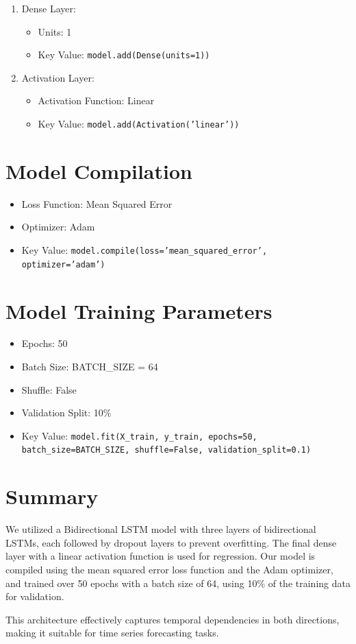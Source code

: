\begin{enumerate}
    \item {Dense Layer}:
    \begin{itemize}
        \item Units: 1
        \item Key Value: \texttt{model.add(Dense(units=1))}
    \end{itemize}

    \item {Activation Layer}:
    \begin{itemize}
        \item Activation Function: Linear
        \item Key Value: \texttt{model.add(Activation('linear'))}
    \end{itemize}
\end{enumerate}

\section*{Model Compilation}

\begin{itemize}
    \item Loss Function: Mean Squared Error
    \item Optimizer: Adam
    \item Key Value: \texttt{model.compile(loss='mean\_squared\_error', optimizer='adam')}
\end{itemize}

\section*{Model Training Parameters}

\begin{itemize}
    \item Epochs: 50
    \item Batch Size: BATCH\_SIZE = 64
    \item Shuffle: False
    \item Validation Split: 10\%
    \item Key Value: \texttt{model.fit(X\_train, y\_train, epochs=50, batch\_size=BATCH\_SIZE, shuffle=False, validation\_split=0.1)}
\end{itemize}

\section*{Summary}

We utilized a Bidirectional LSTM model with three layers of bidirectional LSTMs, each followed by dropout layers to prevent overfitting. The final dense layer with a linear activation function is used for regression. Our model is compiled using the mean squared error loss function and the Adam optimizer, and trained over 50 epochs with a batch size of 64, using 10\% of the training data for validation.

This architecture effectively captures temporal dependencies in both directions, making it suitable for time series forecasting tasks.
